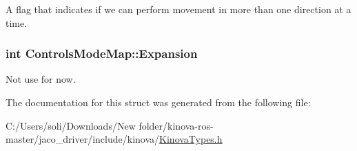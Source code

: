A flag that indicates if we can perform movement in more than one direction at a time. 

\subsubsection[{\texorpdfstring{Expansion}{Expansion}}]{\setlength{\rightskip}{0pt plus 5cm}int Controls\+Mode\+Map\+::\+Expansion}\hypertarget{struct_controls_mode_map_a3fc6f2f0246d5ed5b4cf1635fb073c91}{}\label{struct_controls_mode_map_a3fc6f2f0246d5ed5b4cf1635fb073c91}


Not use for now. 



The documentation for this struct was generated from the following file\+:\begin{DoxyCompactItemize}
\item 
C\+:/\+Users/soli/\+Downloads/\+New folder/kinova-\/ros-\/master/jaco\+\_\+driver/include/kinova/\hyperlink{_kinova_types_8h}{Kinova\+Types.\+h}\end{DoxyCompactItemize}
